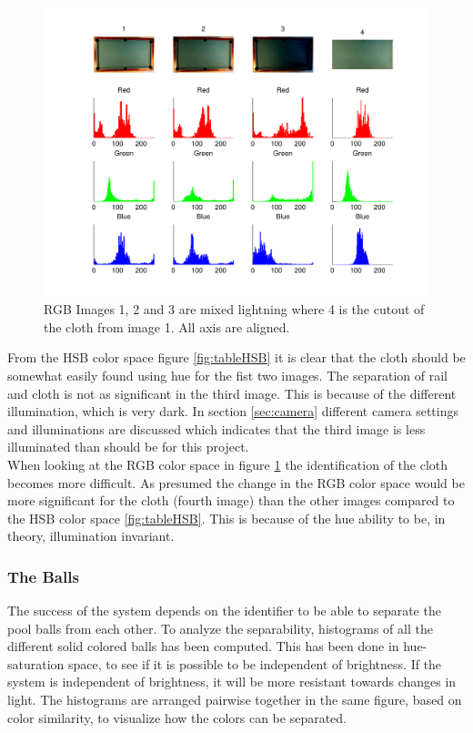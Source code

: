 \begin{figure}[H]
\begin{center}
\leavevmode
\includegraphics[width=1\textwidth]{images/rgb_hist_table}
\end{center}
\caption{RGB Images 1, 2 and 3 are mixed lightning where 4 is the cutout of the cloth from image 1. All axis are aligned.}
\label{fig:tablergb}
\end{figure}

From the HSB color space figure \ref{fig:tableHSB} it is clear that the cloth should be somewhat easily found using hue for the fist two images. The separation of rail and cloth is not as significant in the third image. This is because of the different illumination, which is very dark. In section \ref{sec:camera} different camera settings and illuminations are discussed which indicates that the third image is less illuminated than should be for this project.\\

When looking at the RGB color space in figure \ref{fig:tablergb} the identification of the cloth becomes more difficult. As presumed the change in the RGB color space would be more significant for the cloth (fourth image) than the other images compared to the HSB color space \ref{fig:tableHSB}. This is because of the hue ability to be, in theory, illumination invariant.\\

\subsubsection{The Balls}
\label{sec:analballs}
The success of the system depends on the identifier to be able to separate the pool balls from each other. To analyze the separability, histograms of all the different solid colored balls has been computed. This has been done in hue-saturation space, to see if it is possible to be independent of brightness. If the system is independent of brightness, it will be more resistant towards changes in light. The histograms are arranged pairwise together in the same figure, based on color similarity, to visualize how the colors can be separated.

